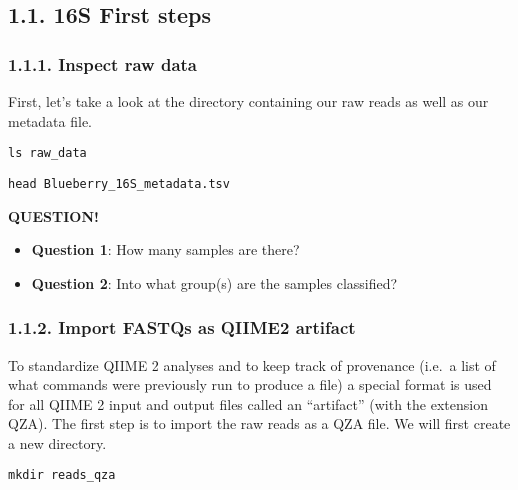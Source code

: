 \documentclass[
]{book}
\providecommand{\tightlist}{%
  \setlength{\itemsep}{0pt}\setlength{\parskip}{0pt}}
\newenvironment{bluebox}{
  \definecolor{shadecolor}{RGB}{172, 210, 237}
  \color{white}
  \begin{shaded}}
 {\end{shaded}}
\begin{document}
\subsection{1.1. 16S First steps}\label{s-first-steps}

\subsubsection{1.1.1. Inspect raw data}\label{inspect-raw-data}

First, let's take a look at the directory containing our raw reads as well as our metadata file.

\begin{verbatim}
ls raw_data
\end{verbatim}

\begin{verbatim}
head Blueberry_16S_metadata.tsv
\end{verbatim}

\begin{bluebox}

\begin{center}
\textbf{QUESTION!}

\end{center}

\begin{itemize}
\tightlist
\item
  \textbf{Question 1}: How many samples are there?
\item
  \textbf{Question 2}: Into what group(s) are the samples classified?
\end{itemize}

\end{bluebox}

\subsubsection{1.1.2. Import FASTQs as QIIME2 artifact}\label{import-fastqs-as-qiime2-artifact}

To standardize QIIME 2 analyses and to keep track of provenance (i.e.~a list of what commands were previously run to produce a file) a special format is used for all QIIME 2 input and output files called an ``artifact'' (with the extension QZA). The first step is to import the raw reads as a QZA file. We will first create a new directory.

\begin{verbatim}
mkdir reads_qza
\end{verbatim}
\end{document}
